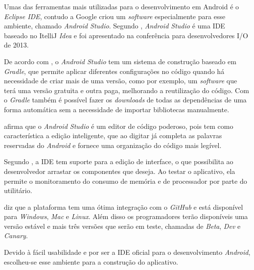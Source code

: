 
	\par Umas das ferramentas mais utilizadas para o desenvolvimento em Android é o
\textit{Eclipse IDE}, contudo a Google criou um \textit{software} especialmente
para esse ambiente, chamado \textit{Android Studio}. Segundo
, \textit{Android Studio} é uma IDE baseado no ItelliJ
\textit{Idea} e foi apresentado na conferência para desenvolvedores I/O de 2013.

	\par De acordo com , o \textit{Android Studio} tem um
sistema de construção baseado em \textit{Gradle}, que permite aplicar
diferentes configurações no código quando há necessidade de criar mais de uma
versão, como por exemplo, um \textit{software} que terá uma versão gratuita e
outra paga, melhorando a reutilização do código. Com o \textit{Gradle} também é
possível fazer os \textit{downloads} de todas as dependências de uma forma
automática sem a necessidade de importar bibliotecas manualmente.

	\par {} afirma que o \textit{Android Studio} é um editor
de código poderoso, pois tem como característica a edição inteligente, que ao
digitar já completa as palavras reservadas do \textit{Android} e fornece uma
organização do código mais legível.

	\par Segundo , a IDE tem suporte para a edição de
interface, o que possibilita ao desenvolvedor arrastar os componentes que
deseja. Ao testar o aplicativo, ela permite o monitoramento do consumo de
memória e de processador por parte do utilitário.

	\par {} diz que a plataforma tem uma ótima integração com
o \textit{GitHub} e está disponível para \textit{Windows}, \textit{Mac} e
\textit{Linux}. Além disso os programadores terão disponíveis uma versão
estável e mais três versões que serão em teste, chamadas de \textit{Beta},
\textit{Dev} e \textit{Canary}.

	\par Devido à fácil usabilidade e por ser a IDE oficial para o desenvolvimento
\textit{Android}, escolheu-se esse ambiente para a construção do aplicativo.
